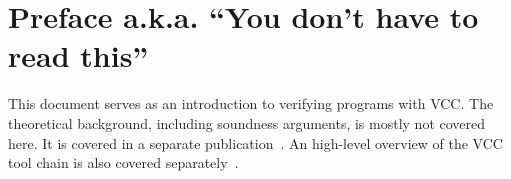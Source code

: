 \section{Preface a.k.a. ``You don't have to read this''}

This document serves as an introduction to verifying programs with VCC.
The theoretical background, including soundness arguments, is mostly
not covered here.
It is covered in a separate publication~\cite{lci}.
An high-level overview of the VCC tool chain is also covered separately~\cite{Cohen:TPHOLs2009-23}.
